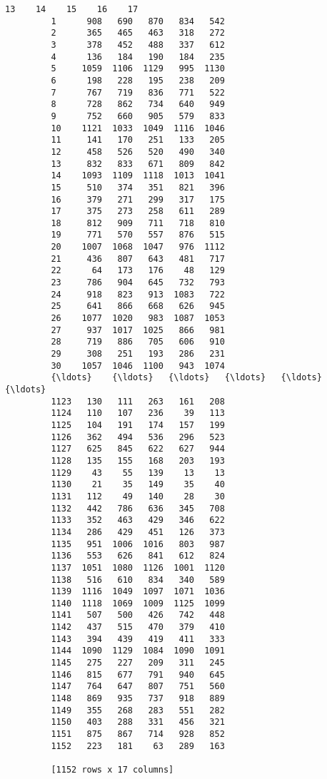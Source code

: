 \documentclass[11pt]{article}
\begin{document}
\begin{Verbatim}[commandchars=\\\{\}]
                 13    14    15    16    17  
         1      908   690   870   834   542  
         2      365   465   463   318   272  
         3      378   452   488   337   612  
         4      136   184   190   184   235  
         5     1059  1106  1129   995  1130  
         6      198   228   195   238   209  
         7      767   719   836   771   522  
         8      728   862   734   640   949  
         9      752   660   905   579   833  
         10    1121  1033  1049  1116  1046  
         11     141   170   251   133   205  
         12     458   526   520   490   340  
         13     832   833   671   809   842  
         14    1093  1109  1118  1013  1041  
         15     510   374   351   821   396  
         16     379   271   299   317   175  
         17     375   273   258   611   289  
         18     812   909   711   718   810  
         19     771   570   557   876   515  
         20    1007  1068  1047   976  1112  
         21     436   807   643   481   717  
         22      64   173   176    48   129  
         23     786   904   645   732   793  
         24     918   823   913  1083   722  
         25     641   866   668   626   945  
         26    1077  1020   983  1087  1053  
         27     937  1017  1025   866   981  
         28     719   886   705   606   910  
         29     308   251   193   286   231  
         30    1057  1046  1100   943  1074  
         {\ldots}    {\ldots}   {\ldots}   {\ldots}   {\ldots}   {\ldots}  
         1123   130   111   263   161   208  
         1124   110   107   236    39   113  
         1125   104   191   174   157   199  
         1126   362   494   536   296   523  
         1127   625   845   622   627   944  
         1128   135   155   168   203   193  
         1129    43    55   139    13    13  
         1130    21    35   149    35    40  
         1131   112    49   140    28    30  
         1132   442   786   636   345   708  
         1133   352   463   429   346   622  
         1134   286   429   451   126   373  
         1135   951  1006  1016   803   987  
         1136   553   626   841   612   824  
         1137  1051  1080  1126  1001  1120  
         1138   516   610   834   340   589  
         1139  1116  1049  1097  1071  1036  
         1140  1118  1069  1009  1125  1099  
         1141   507   500   426   742   448  
         1142   437   515   470   379   410  
         1143   394   439   419   411   333  
         1144  1090  1129  1084  1090  1091  
         1145   275   227   209   311   245  
         1146   815   677   791   940   645  
         1147   764   647   807   751   560  
         1148   869   935   737   918   889  
         1149   355   268   283   551   282  
         1150   403   288   331   456   321  
         1151   875   867   714   928   852  
         1152   223   181    63   289   163  
         
         [1152 rows x 17 columns]
\end{Verbatim}
            
\end{document}
